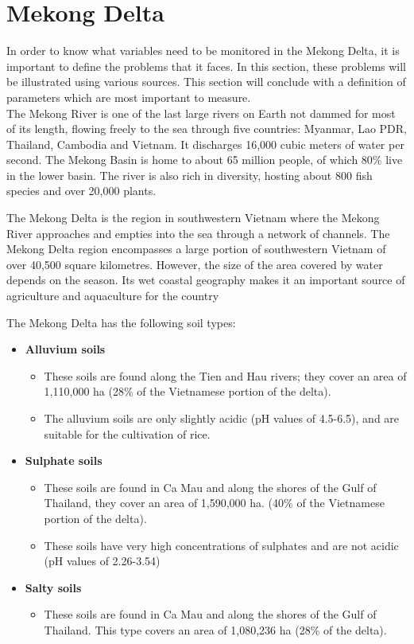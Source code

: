 \newpage
\section{Mekong Delta}

In order to know what variables need to be monitored in the Mekong Delta, it is important to define the problems that it faces. In this section, these problems will be illustrated using various sources. This section will conclude with a definition of parameters which are most important to measure.\\

The Mekong River is one of the last large rivers on Earth not dammed for most of its length, flowing freely to the sea through five countries: Myanmar, Lao PDR, Thailand, Cambodia and Vietnam.  It discharges 16,000 cubic meters of water per second. The Mekong Basin is home to about 65 million people, of which 80\% live in the lower basin. The river is also rich in diversity, hosting about 800 fish species and over 20,000 plants. \cite{worldatlas}

The Mekong Delta is the region in southwestern Vietnam where the Mekong River approaches and empties into the sea through a network of channels. The Mekong Delta region encompasses a large portion of southwestern Vietnam of over 40,500 square kilometres.\cite{arcbc} However, the size of the area covered by water depends on the season. Its wet coastal geography makes it an important source of agriculture and aquaculture for the country




The Mekong Delta has the following soil types: \cite{arcbc}
\begin{itemize}
    \item \textbf{Alluvium soils}
          \begin{itemize} 
            \item These soils are found along the Tien and Hau rivers; they cover an area of 1,110,000 ha (28\% of the Vietnamese portion of the delta). 
            \item The alluvium soils are only slightly acidic (pH values of 4.5-6.5), and are suitable for the cultivation of rice.
          \end{itemize}
    \item \textbf{Sulphate soils}
          \begin{itemize} 
            \item These soils are found in Ca Mau and along the shores of the Gulf of Thailand, they cover an area of 1,590,000 ha. (40\% of the Vietnamese portion of the delta). 
            \item These soils have very high concentrations of sulphates and are not acidic (pH values of 2.26-3.54)
          \end{itemize}
    \item \textbf{Salty soils}
          \begin{itemize} 
            \item These soils are found in Ca Mau and along the shores of the Gulf of Thailand. This type covers an area of 1,080,236 ha (28\% of the delta).
          \end{itemize}
\end{itemize}


